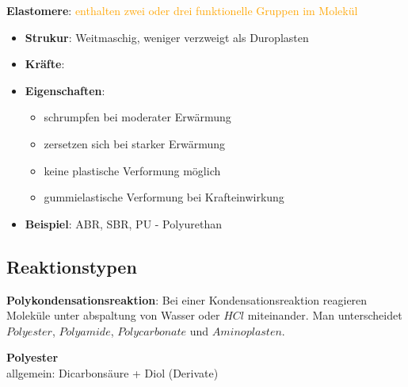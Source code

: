 \vspace{0.3cm}

\textbf{Elastomere}: \textcolor{orange}{enthalten zwei oder drei funktionelle Gruppen im Molekül}
\begin{itemize}
    \item \textbf{Strukur}: Weitmaschig, weniger verzweigt als Duroplasten
    \item \textbf{Kräfte}:
    \item \textbf{Eigenschaften}: 
        \begin{itemize}
            \item schrumpfen bei moderater Erwärmung
            \item zersetzen sich bei starker Erwärmung
            \item keine plastische Verformung möglich
            \item gummielastische Verformung bei Krafteinwirkung
        \end{itemize}
    \item \textbf{Beispiel}: ABR, SBR, PU - Polyurethan
\end{itemize}


\subsection{Reaktionstypen}
\textbf{Polykondensationsreaktion}: Bei einer Kondensationsreaktion reagieren Moleküle unter abspaltung von Wasser oder $HCl$ miteinander. 
Man unterscheidet $Polyester$, $Polyamide$, $Polycarbonate$ und $Aminoplasten$.


\vspace{0.3cm}

\textbf{Polyester} \\
allgemein: Dicarbonsäure + Diol (Derivate)

